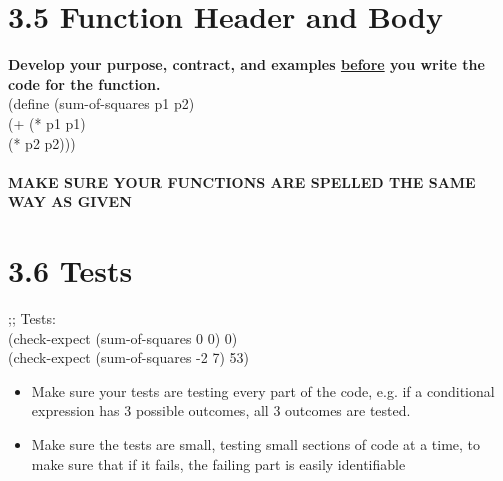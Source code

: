 \documentclass{article}     %
\begin{document}
\section*{3.5 Function Header and Body}
\textbf{Develop your purpose, contract, and examples \underline{before} you write the code for the function.}\\
(define (sum-of-squares p1 p2)\\
\indent(+ (* p1 p1)\\
\indent\indent(* p2 p2)))\\\\
\textbf{MAKE SURE YOUR FUNCTIONS ARE SPELLED THE SAME WAY AS GIVEN}

\section*{3.6 Tests}
;; Tests:\\
(check-expect (sum-of-squares 0 0) 0)\\
(check-expect (sum-of-squares -2 7) 53)
\begin{itemize}
\item Make sure your tests are testing every part of the code, e.g. if a conditional expression has 3 possible outcomes, all 3 outcomes are tested.
\item Make sure the tests are small, testing small sections of code at a time, to make sure that if it fails, the failing part is easily identifiable
\end{itemize}
\end{document}
